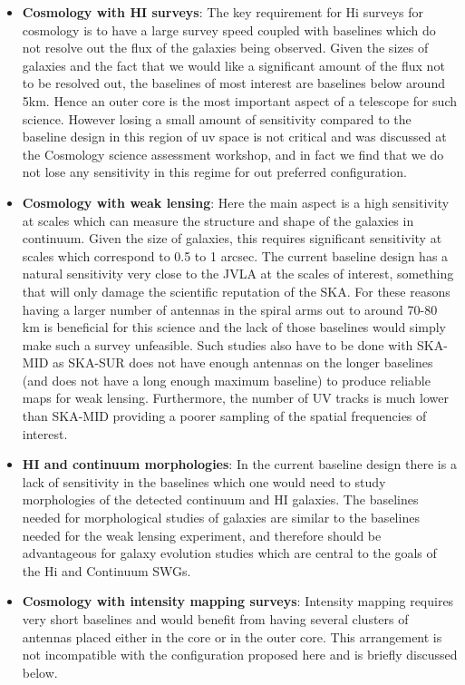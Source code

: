 \documentclass[sfheadings,a4paper,times,9pt,floats,floatfix]{article}
\begin{document}
\begin{itemize}
\item {\bf Cosmology with HI surveys}: The key requirement for H{\sc i}
surveys for cosmology is to have a large
survey speed coupled with baselines which do not resolve out the flux of the galaxies being
observed. Given the sizes of galaxies and the fact that we would like a significant amount of
the flux not to be resolved out, the baselines of most interest are baselines below around
5km. Hence an outer core is the most important aspect of a telescope for such science.
However losing a small amount of sensitivity compared to the baseline design in this region
of uv space is not critical and was discussed at the Cosmology science
assessment workshop, and in fact we find that we do not lose any
sensitivity in this regime for out preferred configuration. 

\item {\bf Cosmology with weak lensing}: Here the main aspect is a high sensitivity at scales which can
measure the structure and shape of the galaxies in continuum. Given the size of galaxies,
this requires significant sensitivity at scales which correspond to
0.5 to 1 arcsec. The current baseline design has a natural sensitivity
very close to the JVLA at the scales of interest, something that will
only damage the scientific reputation of the SKA. 
For these reasons having a larger number of antennas in the spiral arms out to around 70-80
km is beneficial for this science and the lack of those baselines would simply make such a
survey unfeasible. Such studies also have to be done with SKA-MID as SKA-SUR does not have
enough antennas on the longer baselines (and does not have a long
enough maximum baseline) to produce reliable maps for weak
lensing. Furthermore,  the number of UV tracks is much lower than
SKA-MID providing a poorer sampling of the spatial frequencies of
interest. %

\item {\bf HI and continuum morphologies}: In the current baseline design there is a lack of sensitivity
in the baselines which one would need to study morphologies of the detected continuum
and HI galaxies. The baselines needed for morphological studies of galaxies
are similar to the baselines needed for the weak lensing experiment, and therefore should be advantageous for galaxy
evolution studies which are central to the goals of the H{\sc i} and
Continuum SWGs.

\item {\bf Cosmology with intensity mapping surveys}: Intensity mapping requires very short baselines
and would benefit from having several clusters of antennas placed either in the core or in
the outer core. This arrangement is not incompatible with the configuration
proposed here and is briefly discussed below.
\end{itemize}
\end{document}
